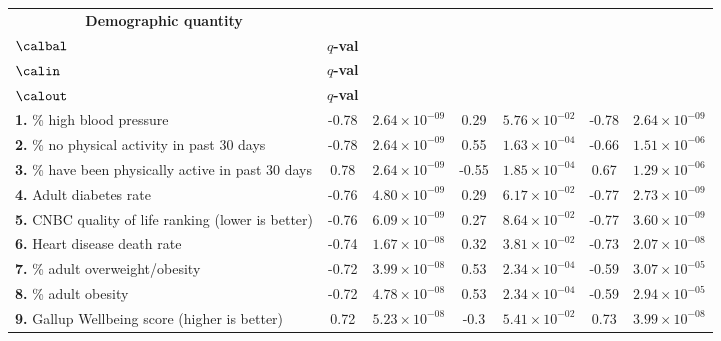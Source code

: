 

\begin{table*}
\footnotesize
\begin{longtable}{|l|c|c|c|c|c|c|}
\hline \multicolumn{1}{|c|}{\textbf{Demographic quantity}}
& \begin{tabular}{@{}c@{}} $\rhospearman$ for \\ $\calbal$ 
\end{tabular} 
& \textbf{$q$-val}
& \begin{tabular}{@{}c@{}}$\rhospearman$ for \\ $\calin$ 
\end{tabular} & \textbf{$q$-val} & 
\begin{tabular}{@{}c@{}}$\rhospearman$ for \\ 
$\calout$ \end{tabular} & 
\textbf{$q$-val} \\\hline
 \textbf{1.} \% high blood pressure \cite{america} & -0.78 & $2.64\times 10^{-09}$ & 0.29 & $5.76\times 10^{-02}$ & -0.78 & $2.64\times 10^{-09}$ \\\hline
 \textbf{2.} \% no physical activity in past 30 days \cite{america} & -0.78 & $2.64\times 10^{-09}$ & 0.55 & $1.63\times 10^{-04}$ & -0.66 & $1.51\times 10^{-06}$ \\\hline
 \textbf{3.} \% have been physically active in past 30 days \cite{america} & 0.78 & $2.64\times 10^{-09}$ & -0.55 & $1.85\times 10^{-04}$ & 0.67 & $1.29\times 10^{-06}$ \\\hline
 \textbf{4.} Adult diabetes rate \cite{cdc} & -0.76 & $4.80\times 10^{-09}$ & 0.29 & $6.17\times 10^{-02}$ & -0.77 & $2.73\times 10^{-09}$ \\\hline
 \textbf{5.} CNBC quality of life ranking \cite{cnbc} (lower is better) & -0.76 & $6.09\times 10^{-09}$ & 0.27 & $8.64\times 10^{-02}$ & -0.77 & $3.60\times 10^{-09}$ \\\hline
 \textbf{6.} Heart disease death rate \cite{kff} & -0.74 & $1.67\times 10^{-08}$ & 0.32 & $3.81\times 10^{-02}$ & -0.73 & $2.07\times 10^{-08}$ \\\hline
 \textbf{7.} \% adult overweight/obesity \cite{kff} & -0.72 & $3.99\times 10^{-08}$ & 0.53 & $2.34\times 10^{-04}$ & -0.59 & $3.07\times 10^{-05}$ \\\hline
 \textbf{8.} \% adult obesity \cite{cdc} & -0.72 & $4.78\times 10^{-08}$ & 0.53 & $2.34\times 10^{-04}$ & -0.59 & $2.94\times 10^{-05}$ \\\hline
 \textbf{9.} Gallup Wellbeing score \cite{gallup} (higher is better) & 0.72 & $5.23\times 10^{-08}$ & -0.3 & $5.41\times 10^{-02}$ & 0.73 & $3.99\times 10^{-08}$ \\\hline

\end{longtable}
\end{table*}
